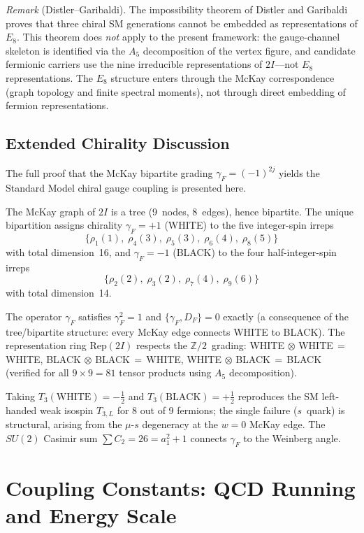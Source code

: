 \documentclass[12pt,a4paper]{article}
\theoremstyle{definition}
\begin{document}
\noindent\textit{Remark} (Distler--Garibaldi).  The impossibility theorem of Distler and Garibaldi~\cite{distler2010} proves that three chiral SM generations cannot be embedded as representations of $E_8$.  This theorem does \emph{not} apply to the present framework: the gauge-channel skeleton is identified via the $A_5$ decomposition of the vertex figure, and candidate fermionic carriers use the nine irreducible representations of $2I$---not $E_8$ representations.  The $E_8$ structure enters through the McKay correspondence (graph topology and finite spectral moments), not through direct embedding of fermion representations.

\subsection{Extended Chirality Discussion}

The full proof that the McKay bipartite grading $\gamma_F = (-1)^{2j}$ yields the Standard Model chiral gauge coupling is presented here.

The McKay graph of $2I$ is a tree (9~nodes, 8~edges), hence bipartite.  The unique bipartition assigns chirality $\gamma_F = +1$ (WHITE) to the five integer-spin irreps
\[
\{\rho_1(1),\; \rho_4(3),\; \rho_5(3),\; \rho_6(4),\; \rho_8(5)\}
\]
with total dimension~16, and $\gamma_F = -1$ (BLACK) to the four half-integer-spin irreps
\[
\{\rho_2(2),\; \rho_3(2),\; \rho_7(4),\; \rho_9(6)\}
\]
with total dimension~14.

The operator $\gamma_F$ satisfies $\gamma_F^2 = 1$ and $\{\gamma_F, D_F\} = 0$ exactly (a consequence of the tree/bipartite structure: every McKay edge connects WHITE to BLACK).  The representation ring $\text{Rep}(2I)$ respects the $\mathbb{Z}/2$~grading: WHITE$\,\otimes\,$WHITE$\,=\,$WHITE, BLACK$\,\otimes\,$BLACK$\,=\,$WHITE, WHITE$\,\otimes\,$BLACK$\,=\,$BLACK (verified for all $9 \times 9 = 81$ tensor products using $A_5$ decomposition).

Taking $T_3(\text{WHITE}) = -\tfrac{1}{2}$ and $T_3(\text{BLACK}) = +\tfrac{1}{2}$ reproduces the SM left-handed weak isospin $T_{3,L}$ for 8 out of 9 fermions; the single failure ($s$~quark) is structural, arising from the $\mu$-$s$ degeneracy at the $w = 0$ McKay edge.  The $SU(2)$ Casimir sum $\sum C_2 = 26 = a_1^2 + 1$ connects $\gamma_F$ to the Weinberg angle.


\section{Coupling Constants: QCD Running and Energy Scale}
\label{sec:S-coupling}
\end{document}
